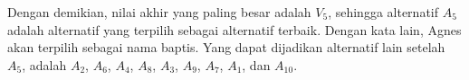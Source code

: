 Dengan demikian, nilai akhir yang paling besar adalah $V_{5}$, sehingga alternatif $A_{5}$ adalah alternatif yang terpilih sebagai alternatif terbaik. Dengan kata lain, Agnes akan terpilih sebagai nama baptis. Yang dapat dijadikan alternatif lain setelah $A_{5}$, adalah $A_{2}$, $A_{6}$, $A_{4}$, $A_{8}$, $A_{3}$, $A_{9}$, $A_{7}$, $A_{1}$, dan $A_{10}$. 



	


	
		
